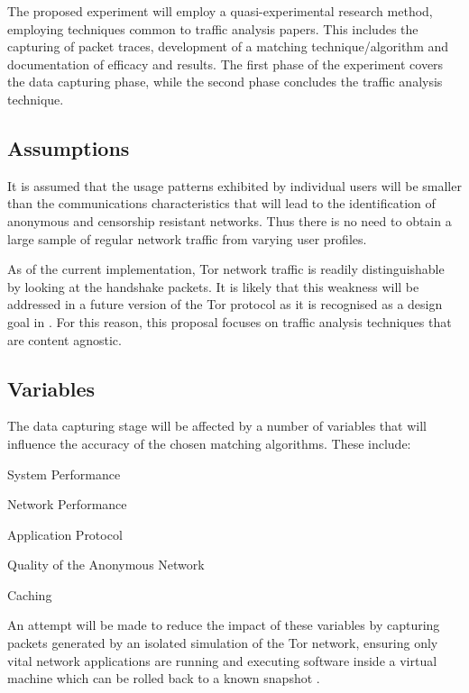 \documentclass{conference}
\begin{document}
The proposed experiment will employ a quasi-experimental research method, employing techniques common to traffic analysis papers. This includes the capturing of packet traces, development of a matching technique/algorithm and documentation of efficacy and results. The first phase of the experiment covers the data capturing phase, while the second phase concludes the traffic analysis technique.

\subsection{Assumptions}

It is assumed that the usage patterns exhibited by individual users will be smaller than the communications characteristics that will lead to the identification of anonymous and censorship resistant networks. Thus there is no need to obtain a large sample of regular network traffic from varying user profiles.

As of the current implementation, Tor network traffic is readily distinguishable by looking at the handshake packets. It is likely that this weakness will be addressed in a future version of the Tor protocol as it is recognised as a design goal in \textcite{Dingledine:2008p1542}. For this reason, this proposal focuses on traffic analysis techniques that are content agnostic.

\subsection{Variables}

The data capturing stage will be affected by a number of variables that will influence the accuracy of the chosen matching algorithms. These include:

\begin{enumerate*}
\item System Performance
\item Network Performance
\item Application Protocol
\item Quality of the Anonymous Network
\item Caching
\end{enumerate*}

An attempt will be made to reduce the impact of these variables by capturing packets generated by an isolated simulation of the Tor network, ensuring only vital network applications are running and executing software inside a virtual machine which can be rolled back to a known snapshot \parencite{website:snapshot-definition}.
\end{document}
